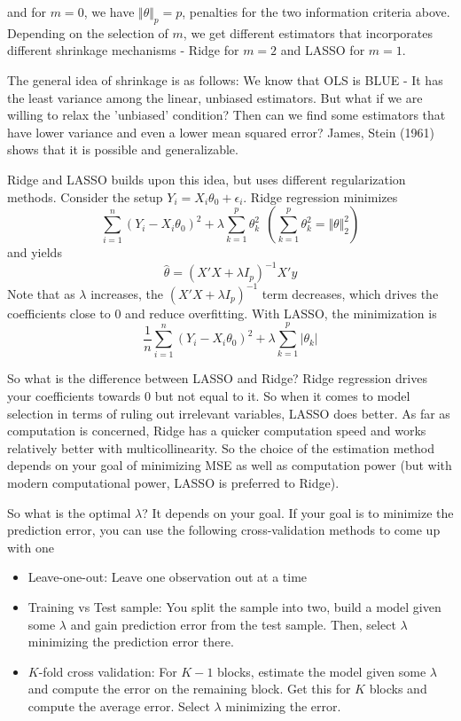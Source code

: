 \documentclass[12pt]{article}
\theoremstyle{definition}
\theoremstyle{property}
\theoremstyle{assumption}
\theoremstyle{example}
\theoremstyle{comment}
\begin{document}
and for $m=0$, we have $\Vert \theta \Vert _p=p$, penalties for the two information criteria above. Depending on the selection of $m$, we get different estimators that incorporates different shrinkage mechanisms - Ridge for $m=2$ and LASSO for $m=1$. \par
The general idea of shrinkage is as follows: We know that OLS is BLUE - It has the least variance among the linear, unbiased estimators. But what if we are willing to relax the 'unbiased' condition? Then can we find some estimators that have lower variance and even a lower mean squared error? James, Stein (1961) shows that it is possible and generalizable. \par 
Ridge and LASSO builds upon this idea, but uses different regularization methods. Consider the setup $Y_i=X_i\theta_0+\epsilon_i$. Ridge regression minimizes
\[
\sum_{i=1}^n(Y_i-X_i\theta_0)^2+\lambda\sum_{k=1}^p \theta_k^2 \ \ \left(\sum_{k=1}^p \theta_k^2=\Vert \theta\Vert_2^2\right)
\]
and yields
\[
\hat{\theta} = (X'X+\lambda I_p)^{-1}X'y
\]
Note that as $\lambda$ increases, the $(X'X+\lambda I_p)^{-1}$ term decreases, which drives the coefficients close to 0 and reduce overfitting. With LASSO, the minimization is 
\[
\frac{1}{n}\sum_{i=1}^n(Y_i-X_i\theta_0)^2+\lambda\sum_{k=1}^p |\theta_k| 
\] 
\par 
So what is the difference between LASSO and Ridge? Ridge regression drives your coefficients towards 0 but not equal to it. So when it comes to model selection in terms of ruling out irrelevant variables, LASSO does better. As far as computation is concerned, Ridge has a quicker computation speed and works relatively better with multicollinearity.  So the choice of the estimation method depends on your goal of minimizing MSE as well as computation power (but with modern computational power, LASSO is preferred to Ridge). \par
So what is the optimal $\lambda$? It depends on your goal. If your goal is to minimize the prediction error, you can use the following cross-validation methods to come up with one
\begin{itemize}
\item Leave-one-out: Leave one observation out at a time
\item Training vs Test sample: You split the sample into two, build a model given some $\lambda$ and gain prediction error from the test sample. Then, select $\lambda$ minimizing the prediction error there.
\item $K$-fold cross validation:  For $K-1$ blocks, estimate the model given some $\lambda$ and compute the error on the remaining block. Get this for $K$ blocks and compute the average error. Select $\lambda$ minimizing the error. 
\end{itemize}
\end{document}
